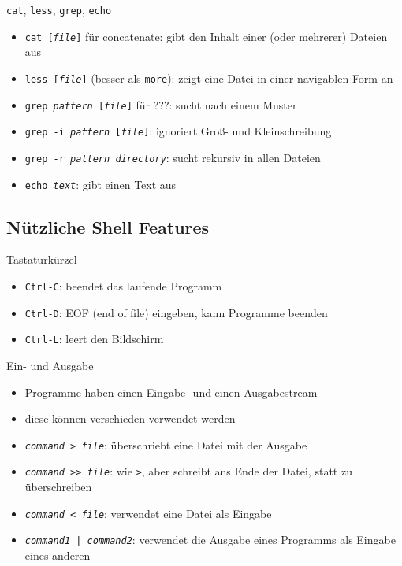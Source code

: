     \begin{frame}{\texttt{cat}, \texttt{less}, \texttt{grep}, \texttt{echo}}
      \begin{itemize}
        \item \texttt{cat [\textit{file}]} für concatenate: gibt den Inhalt einer (oder mehrerer) Dateien aus
        \item \texttt{less [\textit{file}]} (besser als \texttt{more}): zeigt eine Datei in einer navigablen Form an
        \item \texttt{grep \textit{pattern} [\textit{file}]} für ???: sucht nach einem Muster
        \item \texttt{grep -i \textit{pattern} [\textit{file}]}: ignoriert Groß- und Kleinschreibung
        \item \texttt{grep -r \textit{pattern} \textit{directory}}: sucht rekursiv in allen Dateien
        \item \texttt{echo \textit{text}}: gibt einen Text aus
      \end{itemize}
    \end{frame}

  \subsection{Nützliche Shell Features}
    \begin{frame}{Tastaturkürzel}
      \begin{itemize}
        \item \texttt{Ctrl-C}: beendet das laufende Programm
        \item \texttt{Ctrl-D}: EOF (end of file) eingeben, kann Programme beenden
        \item \texttt{Ctrl-L}: leert den Bildschirm
      \end{itemize}
    \end{frame}

    \begin{frame}{Ein- und Ausgabe}
      \begin{itemize}
        \item Programme haben einen Eingabe- und einen Ausgabestream
        \item diese können verschieden verwendet werden
        \item \texttt{\textit{command} > \textit{file}}: überschriebt eine Datei mit der Ausgabe
        \item \texttt{\textit{command} >> \textit{file}}: wie \texttt{>}, aber schreibt ans Ende der Datei, statt zu überschreiben
        \item \texttt{\textit{command} < \textit{file}}: verwendet eine Datei als Eingabe
        \item \texttt{\textit{command1} | \textit{command2}}: verwendet die Ausgabe eines Programms als Eingabe eines anderen
      \end{itemize}
    \end{frame}

